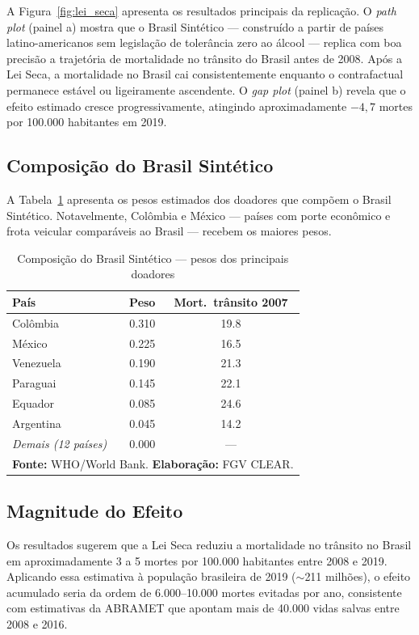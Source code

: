 \documentclass[12pt, a4paper, openany]{book}
\begin{document}
A Figura~\ref{fig:lei_seca} apresenta os resultados principais da replicação. O \textit{path plot} (painel a) mostra que o Brasil Sintético --- construído a partir de países latino-americanos sem legislação de tolerância zero ao álcool --- replica com boa precisão a trajetória de mortalidade no trânsito do Brasil antes de 2008. Após a Lei Seca, a mortalidade no Brasil cai consistentemente enquanto o contrafactual permanece estável ou ligeiramente ascendente. O \textit{gap plot} (painel b) revela que o efeito estimado cresce progressivamente, atingindo aproximadamente $-4{,}7$ mortes por 100.000 habitantes em 2019.

\subsection{Composição do Brasil Sintético}

A Tabela~\ref{tab:pesos_brasil} apresenta os pesos estimados dos doadores que compõem o Brasil Sintético. Notavelmente, Colômbia e México --- países com porte econômico e frota veicular comparáveis ao Brasil --- recebem os maiores pesos.

\begin{table}[H]
\centering
\caption{Composição do Brasil Sintético --- pesos dos principais doadores}
\label{tab:pesos_brasil}
\small
\begin{tabular}{lcc}
\toprule
\textbf{País} & \textbf{Peso} & \textbf{Mort.\ trânsito 2007} \\
\midrule
Colômbia           & 0.310 & 19.8 \\
México             & 0.225 & 16.5 \\
Venezuela          & 0.190 & 21.3 \\
Paraguai           & 0.145 & 22.1 \\
Equador            & 0.085 & 24.6 \\
Argentina          & 0.045 & 14.2 \\
\midrule
\textit{Demais (12 países)} & 0.000 & --- \\
\bottomrule
\multicolumn{3}{l}{\footnotesize \textbf{Fonte:} WHO/World Bank. \textbf{Elaboração:} FGV CLEAR.}
\end{tabular}
\end{table}

\subsection{Magnitude do Efeito}

Os resultados sugerem que a Lei Seca reduziu a mortalidade no trânsito no Brasil em aproximadamente 3 a 5 mortes por 100.000 habitantes entre 2008 e 2019. Aplicando essa estimativa à população brasileira de 2019 ($\sim$211 milhões), o efeito acumulado seria da ordem de 6.000--10.000 mortes evitadas por ano, consistente com estimativas da ABRAMET que apontam mais de 40.000 vidas salvas entre 2008 e 2016.
\end{document}
